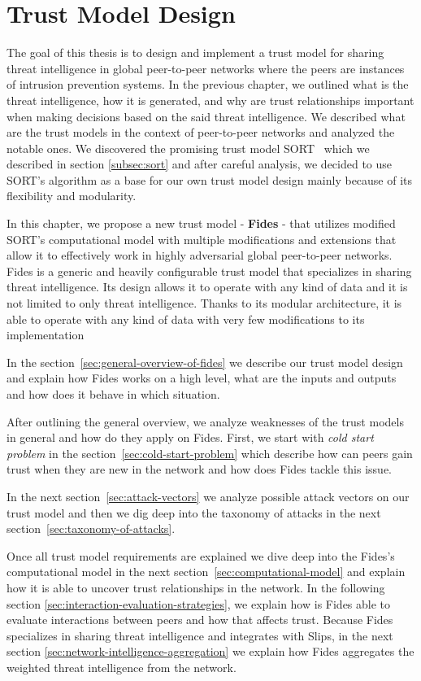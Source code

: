 \chapter{Trust Model Design}
\label{ch:trust-model-design}
The goal of this thesis is to design and implement a trust model for sharing threat intelligence in global peer-to-peer networks where the peers are instances of intrusion prevention systems.
In the previous chapter, we outlined what is the threat intelligence, how it is generated, and why are trust relationships important when making decisions based on the said threat intelligence.
We described what are the trust models in the context of peer-to-peer networks and analyzed the notable ones.
We discovered the promising trust model SORT~\cite{sort} which we described in section \ref{subsec:sort} and after careful analysis, we decided to use SORT's algorithm as a base for our own trust model design mainly because of its flexibility and modularity.

In this chapter, we propose a new trust model - \textbf{Fides} - that utilizes modified SORT's computational model with multiple modifications and extensions that allow it to effectively work in highly adversarial global peer-to-peer networks.
Fides is a generic and heavily configurable trust model that specializes in sharing threat intelligence.
Its design allows it to operate with any kind of data and it is not limited to only threat intelligence. 
Thanks to its modular architecture, it is able to operate with any kind of data with very few modifications to its implementation

In the section~\ref{sec:general-overview-of-fides} we describe our trust model design and explain how Fides works on a high level, what are the inputs and outputs and how does it behave in which situation.

After outlining the general overview, we analyze weaknesses of the trust models in general and how do they apply on Fides.
First, we start with \textit{cold start problem} in the section~\ref{sec:cold-start-problem} which describe how can peers gain trust when they are new in the network and how does Fides tackle this issue.

In the next section~\ref{sec:attack-vectors} we analyze possible attack vectors on our trust model and then we dig deep into the taxonomy of attacks in the next section~\ref{sec:taxonomy-of-attacks}.

Once all trust model requirements are explained we dive deep into the Fides's computational model in the next section~\ref{sec:computational-model}  and explain how it is able to uncover trust relationships in the network.
In the following section \ref{sec:interaction-evaluation-strategies}, we explain how is Fides able to evaluate interactions between peers and how that affects trust.
Because Fides specializes in sharing threat intelligence and integrates with Slips, in the next section \ref{sec:network-intelligence-aggregation} we explain how Fides aggregates the weighted threat intelligence from the network.

